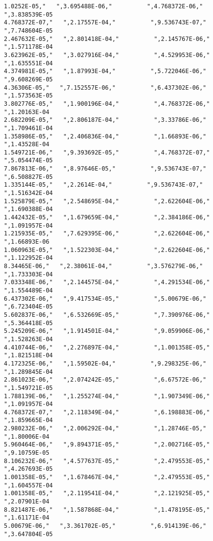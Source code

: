 {\begin{verbatim}
1.0252E-05,"   ",3.695488E-06,"          ",4.768372E-06,"   ",3.838539E-05
4.768372E-07,"   ",2.17557E-04,"          ",9.536743E-07,"   ",7.748604E-05
2.467632E-05,"   ",2.801418E-04,"          ",2.145767E-06,"   ",1.571178E-04
3.623962E-05,"   ",3.027916E-04,"          ",4.529953E-06,"   ",1.635551E-04
4.374981E-05,"   ",1.87993E-04,"          ",5.722046E-06,"   ",9.608269E-05
4.36306E-05,"   ",7.152557E-06,"          ",6.437302E-06,"   ",1.573563E-05
3.802776E-05,"   ",1.900196E-04,"          ",4.768372E-06,"   ",1.20163E-04
2.682209E-05,"   ",2.806187E-04,"          ",3.33786E-06,"   ",1.709461E-04
1.358986E-05,"   ",2.406836E-04,"          ",1.66893E-06,"   ",1.43528E-04
1.549721E-06,"   ",9.393692E-05,"          ",4.768372E-07,"   ",5.054474E-05
7.867813E-06,"   ",8.97646E-05,"          ",9.536743E-07,"   ",6.508827E-05
1.335144E-05,"   ",2.2614E-04,"          ",9.536743E-07,"   ",1.516342E-04
1.525879E-05,"   ",2.548695E-04,"          ",2.622604E-06,"   ",1.690388E-04
1.442432E-05,"   ",1.679659E-04,"          ",2.384186E-06,"   ",1.091957E-04
1.215935E-05,"   ",7.629395E-06,"          ",2.622604E-06,"   ",1.66893E-06
1.060963E-05,"   ",1.522303E-04,"          ",2.622604E-06,"   ",1.122952E-04
8.34465E-06,"   ",2.38061E-04,"          ",3.576279E-06,"   ",1.733303E-04
7.033348E-06,"   ",2.144575E-04,"          ",4.291534E-06,"   ",1.554489E-04
6.437302E-06,"   ",9.417534E-05,"          ",5.00679E-06,"   ",6.723404E-05
5.602837E-06,"   ",6.532669E-05,"          ",7.390976E-06,"   ",5.364418E-05
5.245209E-06,"   ",1.914501E-04,"          ",9.059906E-06,"   ",1.528263E-04
4.410744E-06,"   ",2.276897E-04,"          ",1.001358E-05,"   ",1.821518E-04
4.172325E-06,"   ",1.59502E-04,"          ",9.298325E-06,"   ",1.289845E-04
2.861023E-06,"   ",2.074242E-05,"          ",6.67572E-06,"   ",1.549721E-05
1.788139E-06,"   ",1.255274E-04,"          ",1.907349E-06,"   ",1.091957E-04
4.768372E-07,"   ",2.118349E-04,"          ",6.198883E-06,"   ",1.859665E-04
2.980232E-06,"   ",2.006292E-04,"          ",1.28746E-05,"   ",1.80006E-04
5.960464E-06,"   ",9.894371E-05,"          ",2.002716E-05,"   ",9.10759E-05
8.106232E-06,"   ",4.577637E-05,"          ",2.479553E-05,"   ",4.267693E-05
1.001358E-05,"   ",1.678467E-04,"          ",2.479553E-05,"   ",1.604557E-04
1.001358E-05,"   ",2.119541E-04,"          ",2.121925E-05,"   ",2.07901E-04
8.821487E-06,"   ",1.587868E-04,"          ",1.478195E-05,"   ",1.61171E-04
5.00679E-06,"   ",3.361702E-05,"          ",6.914139E-06,"   ",3.647804E-05


\end{verbatim}
}












